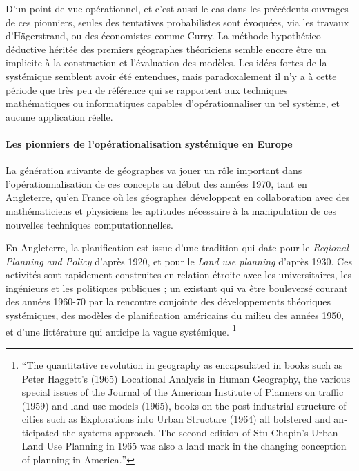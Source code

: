 D'un point de vue opérationnel, et c'est aussi le cas dans les précédents ouvrages de ces pionniers, seules des tentatives probabilistes sont évoquées, via les travaux d'Hägerstrand, ou des économistes comme Curry. La méthode hypothético-déductive héritée des premiers géographes théoriciens semble encore être un implicite à la construction et l'évaluation des modèles. Les idées fortes de la systémique semblent avoir été entendues, mais paradoxalement il n'y a à cette période que très peu de référence qui se rapportent aux techniques mathématiques ou informatiques capables d’opérationnaliser un tel système, et aucune application réelle. \autocite[467-468]{Harvey1969}

\paragraph{Les pionniers de l'opérationalisation systémique en Europe}

La génération suivante de géographes va jouer un rôle important dans l'opérationnalisation de ces concepts au début des années 1970, tant en Angleterre, qu'en France où les géographes développent en collaboration avec des mathématiciens et physiciens les aptitudes nécessaire à la manipulation de ces nouvelles techniques computationnelles. \autocite{Pumain2002}

En Angleterre, la planification est issue d'une tradition qui date pour le \textit{Regional Planning and Policy} d'après 1920, et pour le \textit{Land use planning} d'après 1930. Ces activités sont rapidement construites en relation étroite avec les universitaires, les ingénieurs et les politiques publiques \autocites{Bennett2003}[727]{Davies1997}; un existant qui va être bouleversé courant des années 1960-70 par la rencontre conjointe des développements théoriques systémiques, des modèles de planification américains du milieu des années 1950, et d'une littérature qui anticipe la vague systémique. \autocites[4-8]{McLoughin1985}[253]{Batty1978} \footnote{\foreignquote{english}{The quantitative revolution in geography as encapsulated in books such as Peter Haggett's (1965) Locational Analysis in Human Geography, the various special issues of the Journal of the American Institute of Planners on traffic (1959) and land-use models (1965), books on the post-industrial structure of cities such as Explorations into Urban Structure (1964) all bolstered and anticipated the systems approach. The second edition of Stu Chapin's Urban Land Use Planning in 1965 was also a land mark in the changing conception of planning in America.}}

